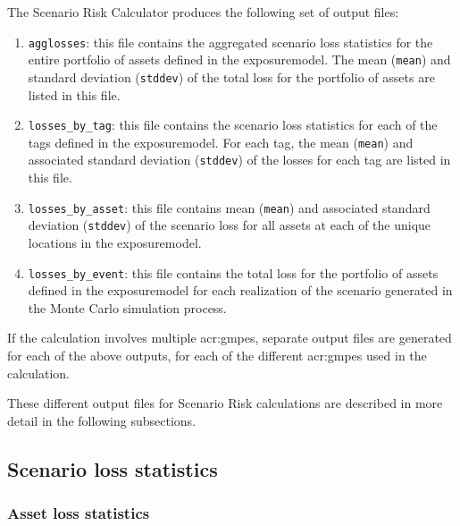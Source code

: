 The Scenario Risk Calculator produces the following set of output files:

\begin{enumerate}

  \item \Verb+agglosses+: this file contains the aggregated scenario
    loss statistics for the entire portfolio of \glspl{asset} defined
    in the \gls{exposuremodel}. The mean (\Verb+mean+) and standard
    deviation (\Verb+stddev+) of the total loss for the portfolio of
    \glspl{asset} are listed in this file.

  \item \Verb+losses_by_tag+: this file contains the scenario
    loss statistics for each of the \glspl{tag} defined in the
    \gls{exposuremodel}. For each \gls{tag}, the mean (\Verb+mean+)
    and associated standard deviation (\Verb+stddev+)
    of the losses for each tag are listed in this file.

  \item \Verb+losses_by_asset+: this file contains mean (\Verb+mean+) and
    associated standard deviation (\Verb+stddev+) of the scenario loss for all
    \glspl{asset} at each of the unique locations in the \gls{exposuremodel}.

  \item \Verb+losses_by_event+: this file contains the total loss for the
    portfolio of \glspl{asset} defined in the \gls{exposuremodel} for each
    realization of the scenario generated in the Monte Carlo simulation process.


\end{enumerate}

If the calculation involves multiple \glspl{acr:gmpe}, separate output files
are generated for each of the above outputs, for each of the different
\glspl{acr:gmpe} used in the calculation.

These different output files for Scenario Risk calculations are described in
more detail in the following subsections.


\subsection{Scenario loss statistics}
\label{subsec:scenario_loss_statistics}

\subsubsection{Asset loss statistics}
\label{subsubsec:scenario_asset_loss_statistics}

